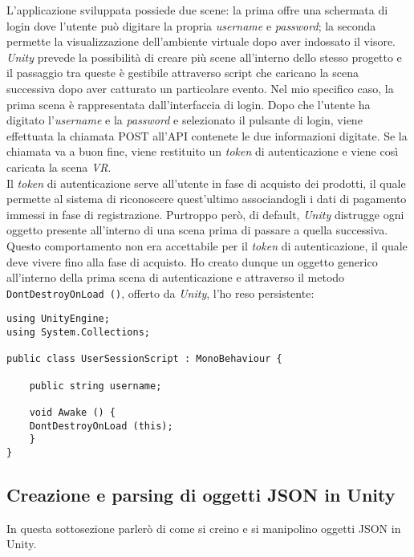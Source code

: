 L'applicazione sviluppata possiede due scene: la prima offre una schermata di login dove l'utente può digitare la propria \textit{username} e \textit{password}; la seconda permette la visualizzazione dell'ambiente virtuale dopo aver indossato il visore. \textit{Unity} prevede la possibilità di creare più scene all'interno dello stesso progetto e il passaggio tra queste è gestibile attraverso script che caricano la scena successiva dopo aver catturato un particolare evento. Nel mio specifico caso, la prima scena è rappresentata dall'interfaccia di login. Dopo che l'utente ha digitato l'\textit{username} e la \textit{password} e selezionato il pulsante di login, viene effettuata la chiamata POST all'API contenete le due informazioni digitate. Se la chiamata va a buon fine, viene restituito un \textit{token} di autenticazione e viene così caricata la scena \textit{VR}. \\
Il \textit{token} di autenticazione serve all'utente in fase di acquisto dei prodotti, il quale permette al sistema di riconoscere quest'ultimo associandogli i dati di pagamento immessi in fase di registrazione. Purtroppo però, di default, \textit{Unity} distrugge ogni oggetto presente all'interno di una scena prima di passare a quella successiva. Questo comportamento non era accettabile per il \textit{token} di autenticazione, il quale deve vivere fino alla fase di acquisto. Ho creato dunque un oggetto generico all'interno della prima scena di autenticazione e attraverso il metodo \texttt{DontDestroyOnLoad ()}, offerto da \textit{Unity}, l'ho reso persistente:

\begin{lstlisting}[style=MyCStyle]
using UnityEngine;
using System.Collections;

public class UserSessionScript : MonoBehaviour {

	public string username;

	void Awake () {
	DontDestroyOnLoad (this);
	}
}
\end{lstlisting}



\subsection{Creazione e parsing di oggetti JSON in Unity}

In questa sottosezione parlerò di come si creino e si manipolino oggetti JSON in Unity.